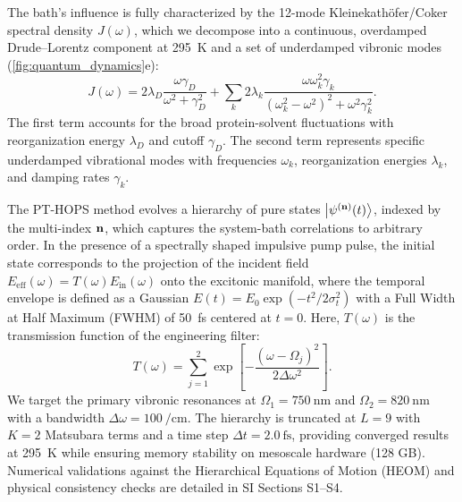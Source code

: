 \documentclass[journal=jpcl,manuscript=letter]{achemso}
\begin{document}
The bath's influence is fully characterized by the 12-mode Kleinekathöfer/Coker spectral density $J(\omega)$, which we decompose into a continuous, overdamped Drude--Lorentz component at \SI{295}{\kelvin} and a set of underdamped vibronic modes (\cref{fig:quantum_dynamics}e):
\begin{equation}
J(\omega) = 2\lambda_D \frac{\omega \gamma_D}{\omega^2 + \gamma_D^2} + \sum_{k} 2\lambda_k \frac{\omega \omega_k^2 \gamma_k}{(\omega_k^2 - \omega^2)^2 + \omega^2 \gamma_k^2}.
\label{eq:spectral_density}
\end{equation}
The first term accounts for the broad protein-solvent fluctuations with reorganization energy $\lambda_D$ and cutoff $\gamma_D$. The second term represents specific underdamped vibrational modes with frequencies $\omega_k$, reorganization energies $\lambda_k$, and damping rates $\gamma_k$.

The PT-HOPS method evolves a hierarchy of pure states $\ket{\psi^{(\vb{n})}(t)}$, indexed by the multi-index $\vb{n}$, which captures the system-bath correlations to arbitrary order. In the presence of a spectrally shaped impulsive pump pulse, the initial state corresponds to the projection of the incident field $E_{\mathrm{eff}}(\omega) = T(\omega) E_{\mathrm{in}}(\omega)$ onto the excitonic manifold, where the temporal envelope is defined as a Gaussian $E(t) = E_0 \exp(-t^2/2\sigma_t^2)$ with a Full Width at Half Maximum (FWHM) of \SI{50}{\femto\second} centered at $t = 0$. Here, $T(\omega)$ is the transmission function of the engineering filter:
\begin{equation}
T(\omega) = \sum_{j=1}^2 \exp\left[ -\frac{(\omega - \Omega_{j})^2}{2\Delta\omega^2} \right].
\label{eq:transmission_function}
\end{equation}
We target the primary vibronic resonances at $\Omega_1 = \SI{750}{\nano\meter}$ and $\Omega_2 = \SI{820}{\nano\meter}$ with a bandwidth $\Delta\omega = \SI{100}{\per\centi\meter}$. The hierarchy is truncated at $L=9$ with $K=2$ Matsubara terms and a time step $\Delta t = \SI{2.0}{\femto\second}$, providing converged results at \SI{295}{\kelvin} while ensuring memory stability on mesoscale hardware (128 GB). Numerical validations against the Hierarchical Equations of Motion (HEOM) and physical consistency checks are detailed in SI Sections S1--S4.

\end{document}
